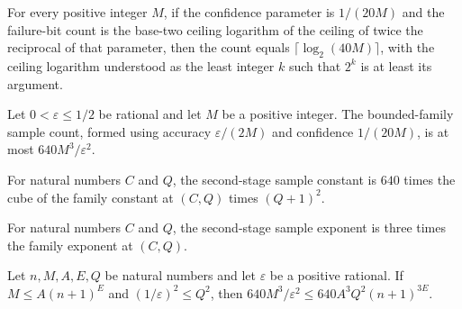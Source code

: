 \begin{theorem}
\label{FABL.boundedFamilyCoefficientFailureBits_eq}
\leanok
{}
For every positive integer $M$, if the confidence parameter is $1/(20M)$ and the
failure-bit count is the base-two ceiling logarithm of the ceiling of twice the
reciprocal of that parameter, then the count equals $\lceil\log_2(40M)\rceil$, with the
ceiling logarithm understood as the least integer $k$ such that $2^k$ is at least its
argument.
\end{theorem}

\begin{theorem}
\label{FABL.boundedFamilySampleCount_cast_le}
\leanok
{}
Let $0<\varepsilon\le 1/2$ be rational and let $M$ be a positive integer. The
bounded-family sample count, formed using accuracy $\varepsilon/(2M)$ and confidence
$1/(20M)$, is at most $640M^3/\varepsilon^2$.
\end{theorem}

\begin{definition}
\label{FABL.learningConsequencesSecondStageSampleConstant}
\leanok
{}
For natural numbers $C$ and $Q$, the second-stage sample constant is $640$ times the
cube of the family constant at $(C,Q)$ times $(Q+1)^2$.
\end{definition}

\begin{definition}
\label{FABL.learningConsequencesSecondStageSampleExponent}
\leanok
{}
For natural numbers $C$ and $Q$, the second-stage sample exponent is three times the
family exponent at $(C,Q)$.
\end{definition}

\begin{theorem}
\label{FABL.cubicSampleExpression_le_fixed_power}
\leanok
{}
Let $n,M,A,E,Q$ be natural numbers and let $\varepsilon$ be a positive rational. If
$M\le A(n+1)^E$ and $(1/\varepsilon)^2\le Q^2$, then $640M^3/\varepsilon^2\le
640A^3Q^2(n+1)^{3E}$.
\end{theorem}

